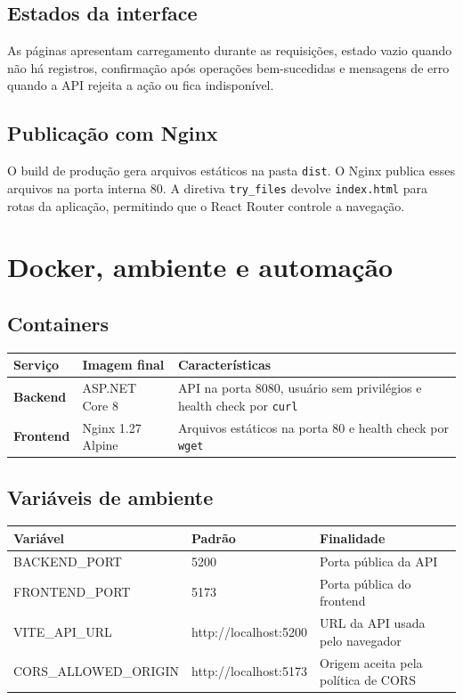 \documentclass[12pt,a4paper,openany]{report}
\begin{document}
\section{Estados da interface}

As páginas apresentam carregamento durante as requisições, estado vazio quando não há registros, confirmação após operações bem-sucedidas e mensagens de erro quando a API rejeita a ação ou fica indisponível.

\section{Publicação com Nginx}

O build de produção gera arquivos estáticos na pasta \texttt{dist}. O Nginx publica esses arquivos na porta interna 80. A diretiva \texttt{try\_files} devolve \texttt{index.html} para rotas da aplicação, permitindo que o React Router controle a navegação.

\chapter{Docker, ambiente e automação}

\section{Containers}

\begin{tabularx}{\textwidth}{>{\bfseries}p{} p{} X}
\toprule
Serviço & Imagem final & Características \\
\midrule
Backend & ASP.NET Core 8 & API na porta 8080, usuário sem privilégios e health check por \texttt{curl} \\
Frontend & Nginx 1.27 Alpine & Arquivos estáticos na porta 80 e health check por \texttt{wget} \\
\bottomrule
\end{tabularx}

\section{Variáveis de ambiente}

\begin{tabularx}{\textwidth}{>{\ttfamily}p{} p{} X}
\toprule
\normalfont\textbf{Variável} & \normalfont\textbf{Padrão} & \normalfont\textbf{Finalidade} \\
\midrule
BACKEND\_PORT & 5200 & Porta pública da API \\
FRONTEND\_PORT & 5173 & Porta pública do frontend \\
VITE\_API\_URL & http://localhost:5200 & URL da API usada pelo navegador \\
CORS\_ALLOWED\_ORIGIN & http://localhost:5173 & Origem aceita pela política de CORS \\
\bottomrule
\end{tabularx}
\end{document}
